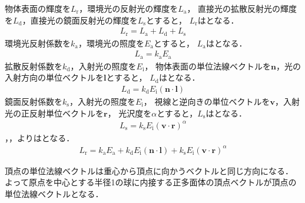 

物体表面の輝度を$L_{\mathrm{r}}$，環境光の反射光の輝度を$L_{\mathrm{a}}$，
直接光の拡散反射光の輝度を$L_{\mathrm{d}}$，直接光の鏡面反射光の輝度を$L_{\mathrm{s}}$とすると，
$L_{\mathrm{r}}$はとなる．
\begin{align}
	L_{\mathrm{r}} = L_{\mathrm{a}} + L_{\mathrm{d}} + L_{\mathrm{s}}\label{equ:L-r}
\end{align}
環境光反射係数を$k_{\mathrm{a}}$，環境光の照度を$E_{\mathrm{a}}$とすると，
$L_{\mathrm{a}}$はとなる．
\begin{align}
	L_{\mathrm{a}} = k_{\mathrm{a}}E_{\mathrm{a}}\label{equ:L-a}
\end{align}
拡散反射係数を$k_{\mathrm{d}}$，入射光の照度を$E_{\mathrm{i}}$，
物体表面の単位法線ベクトルを$\bm{n}$，光の入射方向の単位ベクトルを$\bm{l}$とすると，
$L_{\mathrm{d}}$はとなる．
\begin{align}
	L_{\mathrm{d}} = k_{\mathrm{d}}E_{\mathrm{i}}(\bm{n}\cdot\bm{l})\label{equ:L-d}
\end{align}
鏡面反射係数を$k_{\mathrm{s}}$，入射光の照度を$E_{\mathrm{i}}$，
視線と逆向きの単位ベクトルを$\bm{v}$，入射光の正反射単位ベクトルを$\bm{r}$，
光沢度を$\alpha$とすると，$L_{\mathrm{s}}$はとなる．
\begin{align}
	L_{\mathrm{s}} = k_{\mathrm{s}}E_{\mathrm{i}}(\bm{v}\cdot\bm{r})^{\alpha}\label{equ:L-s}
\end{align}
，，よりはとなる．
\begin{align}
	L_{\mathrm{r}}
	= k_{\mathrm{a}}E_{\mathrm{a}}
	+ k_{\mathrm{d}}E_{\mathrm{i}}(\bm{n}\cdot\bm{l})
	+ k_{\mathrm{s}}E_{\mathrm{i}}(\bm{v}\cdot\bm{r})^{\alpha}\label{equ:L}
\end{align}





頂点の単位法線ベクトルは重心から頂点に向かうベクトルと同じ方向になる．
よって原点を中心とする半径1の球に内接する正多面体の頂点ベクトルが頂点の単位法線ベクトルとなる．

